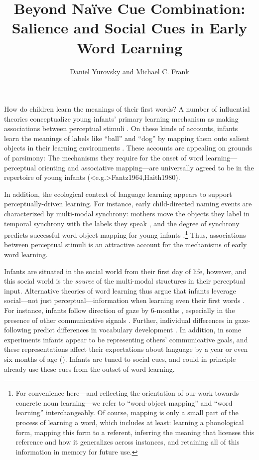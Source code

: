 \documentclass[man,floatsintext]{apa6}
\title{Beyond Na\"{i}ve Cue Combination: Salience and Social Cues in Early Word Learning}
\author{Daniel Yurovsky and Michael C. Frank}
\affiliation{Department of Psychology, Stanford University}
\begin{document}
\maketitle


How do children learn the meanings of their first words? A number of influential theories conceptualize young infants' primary learning mechanism as making associations between perceptual stimuli \cite{Piaget1952, Vygotsky1978}. On these kinds of accounts, infants learn the meanings of labels like ``ball'' and ``dog'' by mapping them onto salient objects in their learning environments \cite{Werker1998,Smith2000}. These accounts are appealing on grounds of parsimony: The mechanisms they require for the onset of word learning---perceptual orienting and associative mapping---are universally agreed to be in the repertoire of young infants (\citeNP<e.g.>{Fantz1964,Haith1980}). 

In addition, the ecological context of language learning appears to support perceptually-driven learning. For instance, early child-directed naming events are characterized by multi-modal synchrony: mothers move the objects they label in temporal synchrony with the labels they speak \cite{Gogate2000}, and the degree of synchrony predicts successful word-object mapping for young infants \cite{Gogate2006}.\footnote{For convenience here---and reflecting the orientation of our work towards concrete noun learning---we refer to ``word-object mapping'' and ``word learning'' interchangeably. Of course, mapping is only a small part of the process of learning a word, which includes at least: learning a phonological form, mapping this form to a referent, inferring the meaning that licenses this reference and how it generalizes across instances, and retaining all of this information in memory for future use.} Thus, associations between perceptual stimuli is an attractive account for the mechanisms of early word learning.

Infants are situated in the social world from their first day of life, however, and this social world is the \emph{source} of the multi-modal structures in their perceptual input. Alternative theories of word learning thus argue that infants leverage social---not just perceptual---information when learning even their first words \cite{Bruner1983,Bloom1998}. For instance, infants follow direction of gaze by 6-months \cite{Dentremont1997}, especially in the presence of other communicative signals \cite{Senju2008}. Further, individual differences in gaze-following predict differences in vocabulary development \cite{Brooks2008}. In addition, in some experiments infants appear to be representing others' communicative goals, and these representations affect their expectations about language by a year or even six months of age (). Infants are tuned to social cues, and could in principle already use these cues from the outset of word learning.
\end{document}
